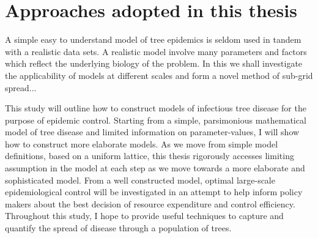 
\section{Approaches adopted in this thesis}

A simple easy to understand model of tree epidemics is seldom used in tandem with a realistic data sets. A realistic model involve many parameters and factors which reflect the underlying biology of the problem. In this we shall investigate the applicability of models at different scales and form a novel method of sub-grid spread...

This study will outline how to construct models of infectious tree disease for the purpose of epidemic control. Starting from a simple, parsimonious mathematical model of tree disease and limited information on parameter-values, I will show how to construct more elaborate models. As we move from simple model definitions, based on a uniform lattice, this thesis rigorously accesses limiting assumption in the model at each step as we move towards a more elaborate and sophisticated model. From a well constructed model, optimal large-scale epidemiological control will be investigated in an attempt to help inform policy makers about the best decision of resource expenditure and control efficiency. Throughout this study, I hope to provide useful techniques to capture and quantify the spread of disease through a population of trees.\\


